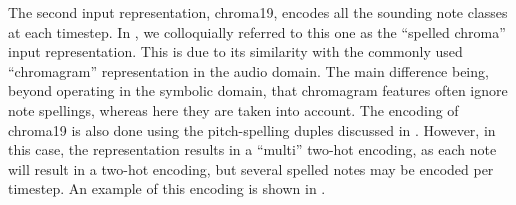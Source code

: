 
The second input representation, \gls{chroma19}, encodes all
the sounding note classes at each timestep. In
\textcite{napoleslopez2021augmentednet}, we colloquially
referred to this one as the ``spelled chroma'' input
representation. This is due to its similarity with the
commonly used ``chromagram'' representation in the audio
domain. The main difference being, beyond operating in the
symbolic domain, that chromagram features often ignore note
spellings, whereas here they are taken into account. The
encoding of \gls{chroma19} is also done using the
pitch-spelling duples discussed in
. However, in this case, the
representation results in a ``multi'' two-hot encoding, as
each note will result in a two-hot encoding, but several
spelled notes may be encoded per timestep. An example of
this encoding is shown in .

